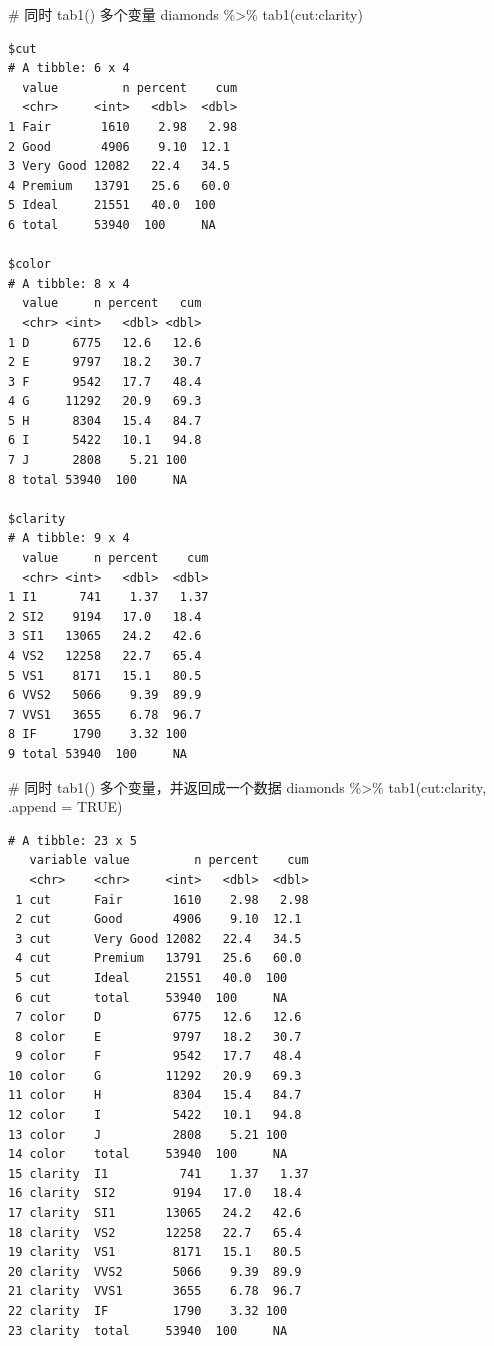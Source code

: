 \documentclass[
  letterpaper,
]{ctexbook}
\newenvironment{Shaded}{\begin{snugshade}}{\end{snugshade}}
\newcommand{\AttributeTok}[1]{\textcolor[rgb]{0.40,0.45,0.13}{#1}}
\newcommand{\CommentTok}[1]{\textcolor[rgb]{0.37,0.37,0.37}{#1}}
\newcommand{\ConstantTok}[1]{\textcolor[rgb]{0.56,0.35,0.01}{#1}}
\newcommand{\FunctionTok}[1]{\textcolor[rgb]{0.28,0.35,0.67}{#1}}
\newcommand{\NormalTok}[1]{\textcolor[rgb]{0.00,0.23,0.31}{#1}}
\newcommand{\SpecialCharTok}[1]{\textcolor[rgb]{0.37,0.37,0.37}{#1}}
\begin{document}
\begin{Shaded}
\begin{Highlighting}[]
\CommentTok{\# 同时 tab1() 多个变量}
\NormalTok{diamonds }\SpecialCharTok{\%\textgreater{}\%}
  \FunctionTok{tab1}\NormalTok{(cut}\SpecialCharTok{:}\NormalTok{clarity)}
\end{Highlighting}
\end{Shaded}

\begin{verbatim}
$cut
# A tibble: 6 x 4
  value         n percent    cum
  <chr>     <int>   <dbl>  <dbl>
1 Fair       1610    2.98   2.98
2 Good       4906    9.10  12.1 
3 Very Good 12082   22.4   34.5 
4 Premium   13791   25.6   60.0 
5 Ideal     21551   40.0  100   
6 total     53940  100     NA   

$color
# A tibble: 8 x 4
  value     n percent   cum
  <chr> <int>   <dbl> <dbl>
1 D      6775   12.6   12.6
2 E      9797   18.2   30.7
3 F      9542   17.7   48.4
4 G     11292   20.9   69.3
5 H      8304   15.4   84.7
6 I      5422   10.1   94.8
7 J      2808    5.21 100  
8 total 53940  100     NA  

$clarity
# A tibble: 9 x 4
  value     n percent    cum
  <chr> <int>   <dbl>  <dbl>
1 I1      741    1.37   1.37
2 SI2    9194   17.0   18.4 
3 SI1   13065   24.2   42.6 
4 VS2   12258   22.7   65.4 
5 VS1    8171   15.1   80.5 
6 VVS2   5066    9.39  89.9 
7 VVS1   3655    6.78  96.7 
8 IF     1790    3.32 100   
9 total 53940  100     NA   
\end{verbatim}

\begin{Shaded}
\begin{Highlighting}[]
\CommentTok{\# 同时 tab1() 多个变量，并返回成一个数据}
\NormalTok{diamonds }\SpecialCharTok{\%\textgreater{}\%}
  \FunctionTok{tab1}\NormalTok{(cut}\SpecialCharTok{:}\NormalTok{clarity, }\AttributeTok{.append =} \ConstantTok{TRUE}\NormalTok{)}
\end{Highlighting}
\end{Shaded}

\begin{verbatim}
# A tibble: 23 x 5
   variable value         n percent    cum
   <chr>    <chr>     <int>   <dbl>  <dbl>
 1 cut      Fair       1610    2.98   2.98
 2 cut      Good       4906    9.10  12.1 
 3 cut      Very Good 12082   22.4   34.5 
 4 cut      Premium   13791   25.6   60.0 
 5 cut      Ideal     21551   40.0  100   
 6 cut      total     53940  100     NA   
 7 color    D          6775   12.6   12.6 
 8 color    E          9797   18.2   30.7 
 9 color    F          9542   17.7   48.4 
10 color    G         11292   20.9   69.3 
11 color    H          8304   15.4   84.7 
12 color    I          5422   10.1   94.8 
13 color    J          2808    5.21 100   
14 color    total     53940  100     NA   
15 clarity  I1          741    1.37   1.37
16 clarity  SI2        9194   17.0   18.4 
17 clarity  SI1       13065   24.2   42.6 
18 clarity  VS2       12258   22.7   65.4 
19 clarity  VS1        8171   15.1   80.5 
20 clarity  VVS2       5066    9.39  89.9 
21 clarity  VVS1       3655    6.78  96.7 
22 clarity  IF         1790    3.32 100   
23 clarity  total     53940  100     NA   
\end{verbatim}
\end{document}
